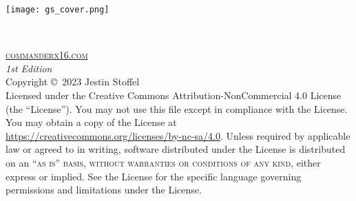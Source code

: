 \documentclass[
	11pt, %
	fleqn, %
	letterpaper, %
]{CommodoreBlueBook}
\begin{document}

\coverpage %
	{\texttt{[image: gs\_cover.png]}} %


\thispagestyle{empty} %

~\vfill %


\noindent \textsc{\href{https://www.commanderx16.com}{commanderx16.com}}\\ %

\noindent \textit{1st Edition}\\ %

\noindent Copyright \copyright\ 2023 Jestin Stoffel\\ %

\noindent Licensed under the Creative Commons Attribution-NonCommercial 4.0
License (the ``License''). You may not use this file except in compliance with
the License. You may obtain a copy of the License at
\url{https://creativecommons.org/licenses/by-nc-sa/4.0}. Unless required by
applicable law or agreed to in writing, software distributed under the License
is distributed on an \textsc{``as is'' basis, without warranties or conditions
of any kind}, either express or implied. See the License for the specific
language governing permissions and limitations under the License.\\ %

\cleardoublepage %


\pagecolor{blue}
\end{document}

